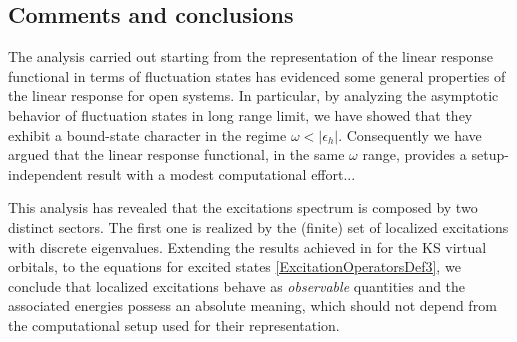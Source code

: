 \documentclass[reprint,aps,prb]{revtex4-1}
\newcommand{\eps}{\epsilon}
\begin{document}
% 
% 
% 


\subsection{Comments and conclusions}

The analysis carried out starting from the representation of the linear response functional in terms of fluctuation states has evidenced some general properties of the linear response
for open systems. In particular, by analyzing the asymptotic behavior of fluctuation states in long range limit, we have showed that they exhibit a bound-state character in the regime  
$\omega<|\eps_h|$. Consequently we have argued that the linear response functional, in the same $\omega$ range, provides a setup-independent result with a modest computational effort... 

This analysis has revealed that the excitations spectrum is composed by two distinct sectors. The first one is realized by the (finite) set of localized excitations with discrete eigenvalues. Extending 
the results achieved in \cite{boffi2016} for the KS virtual orbitals, to the equations for excited states \eqref{ExcitationOperatorsDef3}, we conclude that localized excitations behave as 
\emph{observable} quantities and the associated energies possess an absolute meaning, which should not depend from the computational setup used for their representation. 
\end{document}
